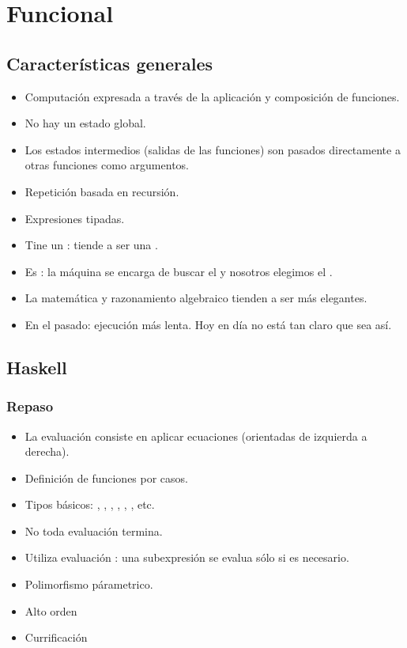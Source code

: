 \section{Funcional}

\subsection{Características generales}

\begin{itemize}
  \item Computación expresada a través de la aplicación y composición de funciones.
  \item No hay un estado global.
  \item Los estados intermedios (salidas de las funciones) son pasados directamente a otras funciones como argumentos.
  \item Repetición basada en recursión.
  \item Expresiones tipadas.
  \item Tine un : tiende a ser una .
  \item Es : la máquina se encarga de buscar el  y nosotros elegimos el .
  \item La matemática y razonamiento algebraico tienden a ser más elegantes.
  \item En el pasado: ejecución más lenta. Hoy en día no está tan claro que sea así.
\end{itemize}

\subsection{Haskell}

\subsubsection{Repaso}

\begin{itemize}
  \item La evaluación consiste en aplicar ecuaciones (orientadas de izquierda a derecha).
  \item Definición de funciones por casos.
  \item Tipos básicos: , , , , , , etc.
  \item No toda evaluación termina.
  \item Utiliza evaluación : una subexpresión se evalua sólo si es necesario.
  \item Polimorfismo párametrico.
  \item Alto orden
  \item Currificación
\end{itemize}

